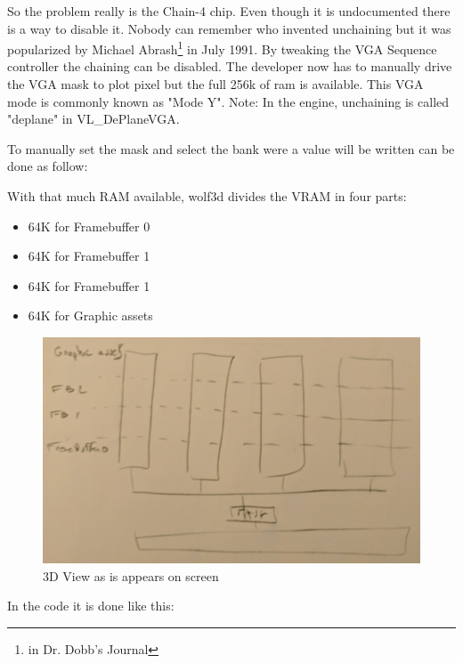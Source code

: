 \documentclass[book.tex]{subfiles}
\begin{document}
 \par
 So the problem really is the Chain-4 chip. Even though it is undocumented there is a way to disable it. Nobody can remember who invented unchaining but it was popularized by Michael Abrash\footnote{in Dr. Dobb's Journal} in July 1991. By tweaking the VGA Sequence controller the chaining can be disabled. The developer now has to manually drive the VGA mask to plot pixel but the full 256k of ram is available. This VGA mode is commonly known as "Mode Y". Note: In the engine, unchaining is called "deplane" in VL\_DePlaneVGA.\\
 \par
 \begin{minipage}{\textwidth}

\end{minipage}
 \par
 To manually set the mask and select the bank were a value will be written can be done as follow:\\
 \par
 \begin{minipage}{\textwidth}

\end{minipage}
 \par
 With that much RAM available, wolf3d divides the VRAM in four parts:
 \begin{itemize}
 \item 64K for Framebuffer 0
 \item 64K for Framebuffer 1
 \item 64K for Framebuffer 1
 \item 64K for Graphic assets
\end{itemize}
\par
\begin{figure}[H]
\centering
 \includegraphics[width=\textwidth]{imgs/vga_layout/vga_ram_architecture.png}
 \caption{3D View as is appears on screen} \label{fig:vga_layout_in_3D}
 \end{figure}
\par
In the code it is done like this:\\
\par
 \begin{minipage}{\textwidth}

\end{minipage}
\par
\end{document}
